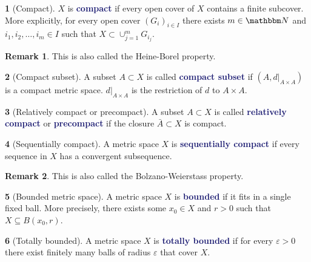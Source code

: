 \documentclass[12pt]{article}
\numberwithin{equation}{section}
\newcommand{\navy}[1]{\textcolor{MidnightBlue}{\bf #1}}
\theoremstyle{plain}
\theoremstyle{definition}
\newtheorem{definition}{\color{MidnightBlue}{\textbf{Definition}}}[section]
\newtheorem*{remark}{Remark}
\def\ss{\subset}
\newcommand{\1}{\mathbbm 1}
\newcommand{\e}{\varepsilon}
\newcommand{\NN}{\mathbbm N}
\begin{document}
\begin{definition}[Compact]
$X$ is \navy{compact} if every open cover of $X$ contains a finite subcover. More explicitly, for every open cover $(G_i)_{i \in I}$ there exists $m \in \NN$ and $i_1, i_2, \ldots, i_m \in I$ such that $X \subset \cup_{j=1}^m G_{i_j}$.
\begin{remark}
This is also called the Heine-Borel property.
\end{remark}
\end{definition}

\begin{definition}[Compact subset]
A subset $A \subset X$ is called \navy{compact subset} if $(A,d\vert_{A\times A})$ is a compact metric space. $d\vert_{A\times A}$ is the restriction of $d$ to $A \times A$.
\end{definition}

\begin{definition}[Relatively compact or precompact]
A subset $A \ss X$ is called \navy{relatively compact} or \navy{precompact} if the closure $\bar{A} \ss X$ is compact.
\end{definition}

\begin{definition}[Sequentially compact]
A metric space $X$ is \navy{sequentially compact} if every sequence in $X$ has a convergent subsequence.
\begin{remark}
This is also called the Bolzano-Weierstass property.
\end{remark}
\end{definition}

\begin{definition}[Bounded metric space]
A metric space $X$ is \navy{bounded} if it fits in a single fixed ball. More precisely, there exists some $x_0 \in X$ and $r > 0$ such that $X \subseteq B(x_0,r)$.
\end{definition}

\begin{definition}[Totally bounded]
A metric space $X$ is \navy{totally bounded} if for every $\e > 0$ there exist finitely many balls of radius $\e$ that cover $X$.
\end{definition}
\end{document}
